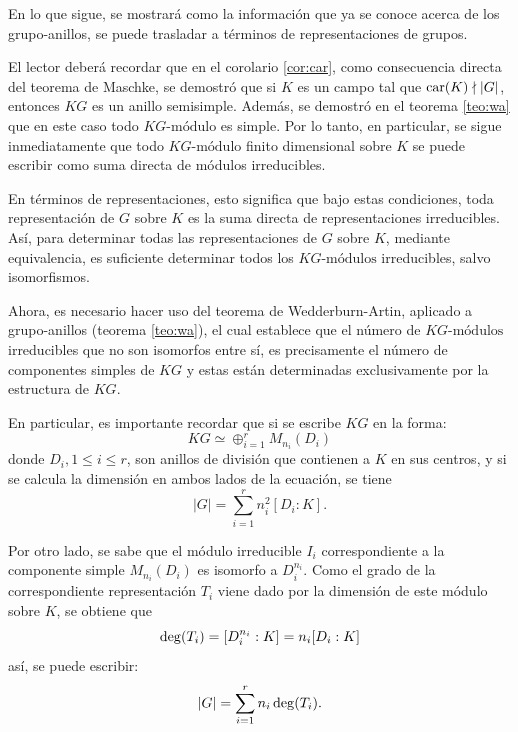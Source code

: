  En lo que sigue, se mostrará como la información que ya se conoce acerca de los grupo-anillos, se puede trasladar a términos de representaciones de grupos. 
 
 El lector deberá recordar que en el corolario \ref{cor:car}, como consecuencia directa del teorema de Maschke, se demostró que si $K$ es un campo tal que $\operatorname{car}(K) \nmid |G|$, entonces $KG$ es un anillo semisimple. Además, se demostró en el teorema \ref{teo:wa} que en este caso todo $KG\mbox{-módulo}$ es simple. Por lo tanto, en particular, se sigue inmediatamente que todo $KG\mbox{-módulo}$ finito dimensional sobre $K$ se puede escribir como suma directa de módulos irreducibles.
 
 En términos de representaciones, esto significa que bajo estas condiciones, toda representación de $G$ sobre $K$ es la suma directa de representaciones irreducibles. Así, para determinar todas las representaciones de $G$ sobre $K$, mediante equivalencia, es suficiente determinar todos los $KG\mbox{-módulos}$ irreducibles, salvo isomorfismos. 
 
 Ahora, es necesario hacer uso del teorema de Wedderburn-Artin, aplicado a grupo-anillos (teorema \ref{teo:wa}), el cual establece que el número de $KG\mbox{-módulos}$ irreducibles que no son isomorfos entre sí, es precisamente el número de componentes simples de $KG$ y estas están determinadas exclusivamente por la estructura de $KG$.
 
 En particular, es importante recordar que si se escribe $KG$ en la forma:
 \begin{equation*} KG \simeq \oplus_{i = 1}^{r}M_{n_i}(D_i) \end{equation*} donde $D_i, 1\leq i \leq r$, son anillos de división que contienen a $K$ en sus centros, y si se calcula la dimensión en ambos lados de la ecuación, se tiene
 \begin{equation*} |G| = \sum_{i = 1}^{r}n_{i}^2[D_i:K]. \end{equation*}
 
 Por otro lado, se sabe que el módulo irreducible $I_i$ correspondiente a la componente simple $M_{n_i}(D_i)$ es isomorfo a $D_{i}^{n_i}$. Como el grado de la correspondiente representación $T_i$ viene dado por la dimensión de este módulo sobre $K$, se obtiene que
 \begin{equation*}  \operatorname{deg} (T_i) = [D_{i}^{n_i}:K] = n_i[D_i:K] \end{equation*} así, se puede escribir: \begin{equation*} |G| = \sum_{i = 1}^{r}n_i\operatorname{deg}(T_i). \end{equation*} 
 
